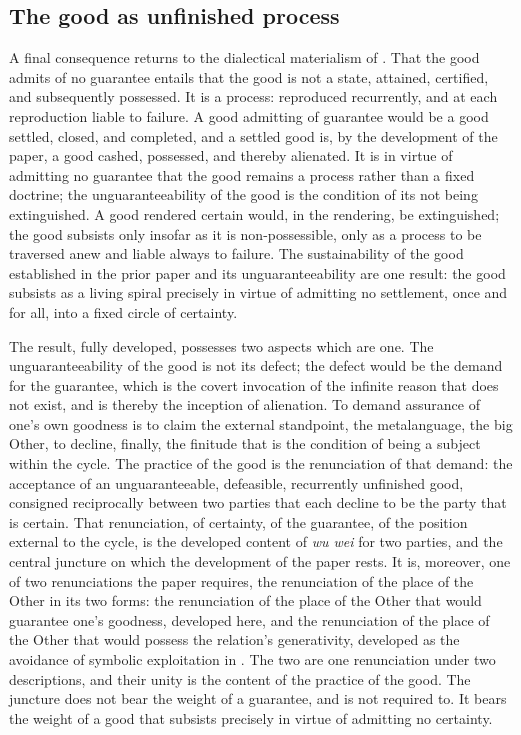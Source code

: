 \subsection{The good as unfinished process}
\label{p10:sec:unfinished}

A final consequence returns to the dialectical materialism of . That the good admits of no guarantee entails that the good is not a state, attained, certified, and subsequently possessed. It is a process: reproduced recurrently, and at each reproduction liable to failure. A good admitting of guarantee would be a good settled, closed, and completed, and a settled good is, by the development of the paper, a good cashed, possessed, and thereby alienated. It is in virtue of admitting no guarantee that the good remains a process rather than a fixed doctrine; the unguaranteeability of the good is the condition of its not being extinguished. A good rendered certain would, in the rendering, be extinguished; the good subsists only insofar as it is non-possessible, only as a process to be traversed anew and liable always to failure. The sustainability of the good established in the prior paper and its unguaranteeability are one result: the good subsists as a living spiral precisely in virtue of admitting no settlement, once and for all, into a fixed circle of certainty.

The result, fully developed, possesses two aspects which are one. The unguaranteeability of the good is not its defect; the defect would be the demand for the guarantee, which is the covert invocation of the infinite reason that does not exist, and is thereby the inception of alienation. To demand assurance of one's own goodness is to claim the external standpoint, the metalanguage, the big Other, to decline, finally, the finitude that is the condition of being a subject within the cycle. The practice of the good is the renunciation of that demand: the acceptance of an unguaranteeable, defeasible, recurrently unfinished good, consigned reciprocally between two parties that each decline to be the party that is certain. That renunciation, of certainty, of the guarantee, of the position external to the cycle, is the developed content of \emph{wu wei} for two parties, and the central juncture on which the development of the paper rests. It is, moreover, one of two renunciations the paper requires, the renunciation of the place of the Other in its two forms: the renunciation of the place of the Other that would guarantee one's goodness, developed here, and the renunciation of the place of the Other that would possess the relation's generativity, developed as the avoidance of symbolic exploitation in . The two are one renunciation under two descriptions, and their unity is the content of the practice of the good. The juncture does not bear the weight of a guarantee, and is not required to. It bears the weight of a good that subsists precisely in virtue of admitting no certainty.
